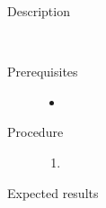 \begin{description}
	\item[Description] \hfill \\
		
	\item[Prerequisites] \hfill
		\begin{itemize}
			\item{}
		\end{itemize}
	\item[Procedure] \hfill
		\begin{enumerate}
			\item{}
		\end{enumerate}
	\item[Expected results] \hfill \\

\end{description}